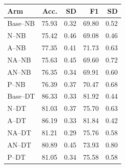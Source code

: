 \begin{tabular}{lrrrr}
\toprule
Arm & Acc. & SD & F1 & SD \\
\midrule
Base--NB & 75.93 & 0.32 & 69.80 & 0.52 \\
N--NB & 75.42 & 0.46 & 69.08 & 0.46 \\
A--NB & 77.35 & 0.41 & 71.73 & 0.63 \\
NA--NB & 75.63 & 0.45 & 69.60 & 0.72 \\
AN--NB & 76.35 & 0.34 & 69.91 & 0.60 \\
P--NB & 76.39 & 0.37 & 70.47 & 0.68 \\
Base--DT & 86.33 & 0.33 & 81.92 & 0.44 \\
N--DT & 81.03 & 0.37 & 75.70 & 0.63 \\
A--DT & 86.19 & 0.33 & 81.84 & 0.42 \\
NA--DT & 81.21 & 0.29 & 75.76 & 0.58 \\
AN--DT & 80.89 & 0.45 & 73.93 & 0.80 \\
P--DT & 81.05 & 0.34 & 75.58 & 0.58 \\
\bottomrule
\end{tabular}
